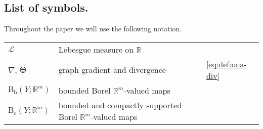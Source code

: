 \documentclass[11pt,reqno]{amsart}
\numberwithin{equation}{section}
\newcommand{\CE}[2]{\calC \calE([#1,#2])}
\newcommand{\R}{\mathbb{R}}
\newcommand{\calC}{\mathcal{C}}
\newcommand{\calE}{\mathcal{E}}
\newcommand{\scrL}{\mathscr{L}}
\newcommand{\dnabla}{\overline\nabla}
\theoremstyle{definition}
\newcommand{\edg}{E}
\newcommand{\ona}{\dnabla}
\newcommand{\odiv}[1]{\dnabla \cdot(#1)}
\renewcommand{\odiv}[1]{\mathop{\overline{\mathrm{div}}}#1}
\newcommand{\CER}[2]{\mathcal{A}{(#1,#2)}}
\newcommand{\Cc}{\mathrm{C}_{\mathrm{c}}}
\newcommand{\Cb}{\mathrm{C}_{\mathrm{b}}}
\newcommand{\Bb}{\mathrm{B}_{\mathrm b}}
\newcommand{\Bc}{\mathrm{B}_{\mathrm c}}
\newcommand{\Co}{\mathrm{C}_{0}}
\newcommand{\Fish}{\mathscr{D}}
\def\calS{\mathscr E}
\newcommand{\Lebone}{\scrL}
\newcommand{\bnu}{\boldsymbol\upnu}
\newcommand{\bj}{{\boldsymbol j}}
\newcommand{\EEE}{\color{black}}
\numberwithin{equation}{section}
\begin{document}
\subsection*{\bf List of symbols.}
Throughout the paper we will use the following notation.
\begin{center}\bigskip
\newcommand{\specialcell}[2][c]{%
  \begin{tabular}[#1]{@{}l@{}}#2\end{tabular}}
\begin{small}
\begin{longtable}{lll}
$\Lebone$ & Lebesgue measure on $\R$ & 
\\
$\ona$, $\odiv$ & graph gradient and divergence &\eqref{eq:def:ona-div}
\\
$ \Bb(Y;\R^m)$ & bounded Borel $\R^m$-valued maps & 
\\
$ \Bc(Y;\R^m)$ & bounded and compactly supported  Borel $\R^m$-valued maps & 

\end{longtable}
\end{small}
\end{center}
\end{document}
